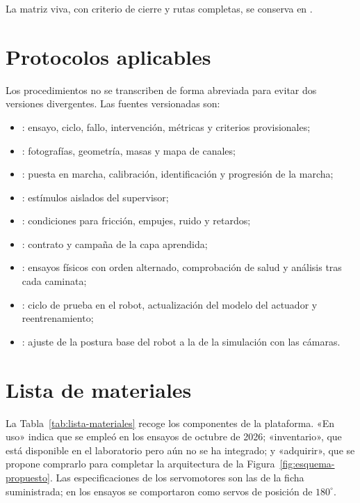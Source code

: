 La matriz viva, con criterio de cierre y rutas completas, se conserva en
.

\section{Protocolos aplicables}

Los procedimientos no se transcriben de forma abreviada para evitar dos
versiones divergentes. Las fuentes versionadas son:

\begin{itemize}
\item {}: ensayo, ciclo,
fallo, intervención, métricas y criterios provisionales;
\item {}: fotografías,
geometría, masas y mapa de canales;
\item {}: puesta en marcha, calibración,
identificación y progresión de la marcha;
\item {}: estímulos
aislados del supervisor;
\item {}: condiciones para
fricción, empujes, ruido y retardos;
\item {}: contrato y campaña de la
capa aprendida;
\item {}: ensayos físicos
con orden alternado, comprobación de salud y análisis tras cada caminata;
\item {}: ciclo de prueba en el robot,
actualización del modelo del actuador y reentrenamiento;
\item {}: ajuste de la
postura base del robot a la de la simulación con las cámaras.
\end{itemize}

\section{Lista de materiales}
\label{sec:lista-materiales}

La Tabla~\ref{tab:lista-materiales} recoge los componentes de la plataforma.
«En uso» indica que se empleó en los ensayos de octubre de 2026; «inventario»,
que está disponible en el laboratorio pero aún no se ha integrado; y «adquirir»,
que se propone comprarlo para completar la arquitectura de la
Figura~\ref{fig:esquema-propuesto}. Las especificaciones de los servomotores son
las de la ficha suministrada; en los ensayos se comportaron como servos de
posición de $180^\circ$.

